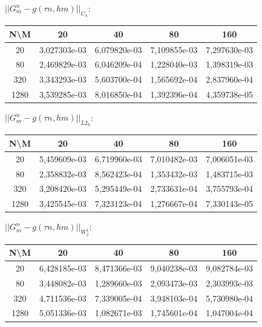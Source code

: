 \documentclass[a4paper, 11pt]{article}
\begin{document}
\newpage
$||G_m^n - g (\tau n, hm)||_{C_h}$:
\begin{center}
\begin{tabular}{|c|c|c|c|c|}
\hline 
 N\textbackslash M &      20      &      40      &      80      &     160      \\ 
 \hline 
        20         & 3,027303e-03 & 6,079820e-03 & 7,109855e-03 & 7,297630e-03 \\ 
 \hline 
        80         & 2,469829e-03 & 6,046209e-04 & 1,228040e-03 & 1,398319e-03 \\ 
 \hline 
        320        & 3,343293e-03 & 5,603700e-04 & 1,565692e-04 & 2,837960e-04 \\ 
 \hline 
       1280        & 3,539285e-03 & 8,016850e-04 & 1,392396e-04 & 4,359738e-05 \\ 
 \hline 
\end{tabular}
\end{center}
$||G_m^n - g (\tau n, hm)||_{L2_h}$:
\begin{center}
\begin{tabular}{|c|c|c|c|c|}
\hline 
 N\textbackslash M &      20      &      40      &      80      &     160      \\ 
 \hline 
        20         & 5,459609e-03 & 6,719960e-03 & 7,010482e-03 & 7,006051e-03 \\ 
 \hline 
        80         & 2,358832e-03 & 8,562423e-04 & 1,353432e-03 & 1,483715e-03 \\ 
 \hline 
        320        & 3,208420e-03 & 5,295449e-04 & 2,733631e-04 & 3,755793e-04 \\ 
 \hline 
       1280        & 3,425545e-03 & 7,323123e-04 & 1,276667e-04 & 7,330143e-05 \\ 
 \hline 
\end{tabular}
\end{center}
$||G_m^n - g (\tau n, hm)||_{W_2^1}$:
\begin{center}
\begin{tabular}{|c|c|c|c|c|}
\hline 
 N\textbackslash M &      20      &      40      &      80      &     160      \\ 
 \hline 
        20         & 6,428185e-03 & 8,471366e-03 & 9,040238e-03 & 9,082784e-03 \\ 
 \hline 
        80         & 3,448082e-03 & 1,289660e-03 & 2,093473e-03 & 2,303993e-03 \\ 
 \hline 
        320        & 4,711536e-03 & 7,339005e-04 & 3,948103e-04 & 5,730980e-04 \\ 
 \hline 
       1280        & 5,051336e-03 & 1,082671e-03 & 1,745601e-04 & 1,047004e-04 \\ 
 \hline 
\end{tabular}
\end{center}
\end{document}
